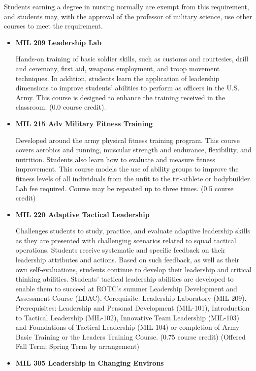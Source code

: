 \documentclass[
  letterpaper,
]{scrbook}
\begin{document}
Students earning a degree in nursing normally are exempt from this
requirement, and students may, with the approval of the professor of
military science, use other courses to meet the requirement.

\begin{itemize}
\item
  \textbf{MIL 209 Leadership Lab}

  Hands-on training of basic soldier skills, such as customs and
  courtesies, drill and ceremony, first aid, weapons employment, and
  troop movement techniques. In addition, students learn the application
  of leadership dimensions to improve students' abilities to perform as
  officers in the U.S. Army. This course is designed to enhance the
  training received in the classroom. (0.0 course credit).
\item
  \textbf{MIL 215 Adv Military Fitness Training}

  Developed around the army physical fitness training program. This
  course covers aerobics and running, muscular strength and endurance,
  flexibility, and nutrition. Students also learn how to evaluate and
  measure fitness improvement. This course models the use of ability
  groups to improve the fitness levels of all individuals from the unfit
  to the tri-athlete or bodybuilder. Lab fee required. Course may be
  repeated up to three times. (0.5 course credit)
\item
  \textbf{MIL 220 Adaptive Tactical Leadership}

  Challenges students to study, practice, and evaluate adaptive
  leadership skills as they are presented with challenging scenarios
  related to squad tactical operations. Students receive systematic and
  specific feedback on their leadership attributes and actions. Based on
  such feedback, as well as their own self-evaluations, students
  continue to develop their leadership and critical thinking abilities.
  Students' tactical leadership abilities are developed to enable them
  to succeed at ROTC's summer Leadership Development and Assessment
  Course (LDAC). Corequisite: Leadership Laboratory (MIL-209).
  Prerequisites: Leadership and Personal Development (MIL-101),
  Introduction to Tactical Leadership (MIL-102), Innovative Team
  Leadership (MIL-103) and Foundations of Tactical Leadership (MIL-104)
  or completion of Army Basic Training or the Leaders Training Course.
  (0.75 course credit) (Offered Fall Term; Spring Term by arrangement)
\item
  \textbf{MIL 305 Leadership in Changing Environs}


\end{itemize}
\end{document}
